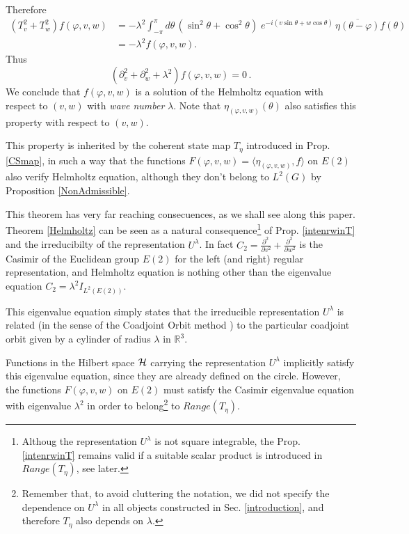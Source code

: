 \documentclass[11pt]{article}
\newcommand{\conj}[1]{\overline{#1}}
\begin{document}
Therefore
\begin{eqnarray}
  \left(T_v^2+T_w^2\right)f(\varphi,v,w)
  &=-\lambda^2\int_{-\pi}^{\pi}d\theta\,(\sin^2\theta+\cos^2\theta)\;
    e^{-i(v\sin\theta+w\cos\theta)}\,\conj{\eta(\theta-\varphi)}f(\theta)\nonumber\\
  &=-\lambda^2f(\varphi,v,w).
\end{eqnarray}
Thus
\[
  \left(\partial_v^2+\partial_w^2+\lambda^2\right)f(\varphi,v,w)=0\,.
\]
We conclude that $f(\varphi,v,w)$ is a solution of the Helmholtz equation with
respect to $(v,w)$ with \textit{wave number} $\lambda$. Note that $\eta_{(\varphi,v,w)}(\theta)$ also satisfies this property with respect to $(v,w)$.
 
 
 
 
 This property is inherited by the coherent state map $T_\eta$ introduced in Prop. \ref{CSmap}, in such a way that the functions
  $F(\varphi,v,w)=\langle \eta_{(\varphi,v,w)},f\rangle$ on $E(2)$ also verify Helmholtz equation, although they don't belong to $L^2(G)$ by Proposition \ref{NonAdmissible}.

 
This theorem has very far reaching consecuences, as we shall see along this paper. Theorem \ref{Helmholtz} can be seen as a natural consequence\footnote{Althoug the representation $U^\lambda$ is not square integrable, the Prop. \ref{intenrwinT} remains valid if a suitable scalar product is introduced in $Range(T_\eta)$, see later.}  of Prop. \ref{intenrwinT} and the irreducibilty of the representation $U^\lambda$. In fact $C_2= \frac{\partial^2\,}{\partial v^2}+\frac{\partial^2\,}{\partial w^2}$ is the Casimir of the Euclidean group $E(2)$ for the left (and right) regular representation, and Helmholtz equation is nothing other than the eigenvalue equation   $C_2=\lambda^2 I_{L^2(E(2))}$.
 
 This eigenvalue equation simply states that the irreducible representation $U^\lambda$ is related (in the sense of the Coadjoint Orbit method \cite{Kirillov76}) to the particular coadjoint orbit
 given by a cylinder of radius $\lambda$ in $\mathbb{R}^3$.
 
 
 Functions in the Hilbert space ${\cal H}$ carrying the representation $U^\lambda$ implicitly satisfy this eigenvalue equation, since they are already defined on the circle. However, the functions  $F(\varphi,v,w)$  on $E(2)$ must  satisfy the Casimir eigenvalue equation with eigenvalue $\lambda^2$ in order to belong\footnote{Remember that, to avoid cluttering the notation, we did not specify the dependence on $U^\lambda$ in all objects constructed in Sec. \ref{introduction}, and therefore $T_\eta$ also depends on $\lambda$.} to $Range(T_\eta)$.
 
\end{document}
